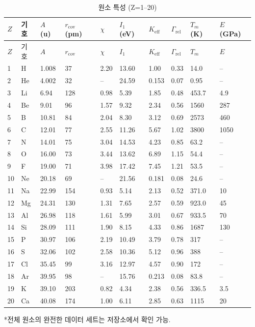 \documentclass[12pt,a4paper]{article}
\newcommand{\Keff}{K_{\mathrm{eff}}}
\begin{document}
	\begin{longtable}{p{0.6cm}p{1.2cm}p{1.2cm}p{1.2cm}p{1.2cm}p{1.2cm}p{1.5cm}p{1.2cm}p{1.2cm}p{1.2cm}}
		\caption{원소 특성 (Z=1–20)} \label{tab:elem-data-first20} \\
		\toprule
		\(Z\) & 기호 & \(A\) (u) & \(r_{\text{cov}}\) (pm) & \(\chi\) & \(I_1\) (eV) & \(\Keff\) & \(\Gamma_{\text{rel}}\) & \(T_m\) (K) & \(E\) (GPa) \\
		\midrule
		\endfirsthead
		\toprule
		\(Z\) & 기호 & \(A\) & \(r_{\text{cov}}\) & \(\chi\) & \(I_1\) & \(\Keff\) & \(\Gamma_{\text{rel}}\) & \(T_m\) & \(E\) \\
		\midrule
		\endhead
		1  & H  & 1.008  & 37   & 2.20 & 13.60 & 1.00  & 0.33  & 14.0  & – \\
		2  & He & 4.002  & 32   & –    & 24.59 & 0.153 & 0.07  & 0.95  & – \\
		3  & Li & 6.94   & 128  & 0.98 & 5.39  & 1.85  & 0.48  & 453.7 & 4.9 \\
		4  & Be & 9.01   & 96   & 1.57 & 9.32  & 2.34  & 0.56  & 1560  & 287 \\
		5  & B  & 10.81  & 84   & 2.04 & 8.30  & 3.12  & 0.69  & 2573  & 460\footnotemark \\
		6  & C  & 12.01  & 77   & 2.55 & 11.26 & 5.67  & 1.02  & 3800  & 1050\footnotemark \\
		7  & N  & 14.01  & 75   & 3.04 & 14.53 & 4.23  & 0.85  & 63.2  & – \\
		8  & O  & 16.00  & 73   & 3.44 & 13.62 & 6.89  & 1.15  & 54.4  & – \\
		9  & F  & 19.00  & 71   & 3.98 & 17.42 & 7.45  & 1.21  & 53.5  & – \\
		10 & Ne & 20.18  & 69   & –    & 21.56 & 0.181 & 0.08  & 24.6  & – \\
		11 & Na & 22.99  & 154  & 0.93 & 5.14  & 2.13  & 0.52  & 371.0 & 10 \\
		12 & Mg & 24.31  & 130  & 1.31 & 7.65  & 2.57  & 0.59  & 923.0 & 45 \\
		13 & Al & 26.98  & 118  & 1.61 & 5.99  & 3.01  & 0.67  & 933.5 & 70 \\
		14 & Si & 28.09  & 111  & 1.90 & 8.15  & 4.33  & 0.86  & 1687  & 130 \\
		15 & P  & 30.97  & 106  & 2.19 & 10.49 & 3.79  & 0.78  & 317   & – \\
		16 & S  & 32.06  & 102  & 2.58 & 10.36 & 5.12  & 0.96  & 388   & – \\
		17 & Cl & 35.45  & 99   & 3.16 & 12.97 & 4.57  & 0.90  & 172   & – \\
		18 & Ar & 39.95  & 98   & –    & 15.76 & 0.213 & 0.08  & 83.8  & – \\
		19 & K  & 39.10  & 203  & 0.82 & 4.34  & 2.38  & 0.56  & 336.5 & 3.5 \\
		20 & Ca & 40.08  & 174  & 1.00 & 6.11  & 2.85  & 0.63  & 1115  & 20 \\
		\bottomrule
	\end{longtable}
	\vspace{0.2cm}
	*전체 원소의 완전한 데이터 세트는 저장소에서 확인 가능.
	
\end{document}
